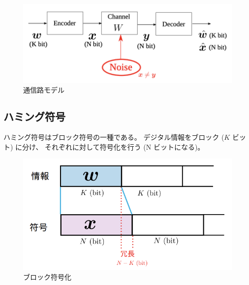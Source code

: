 \documentclass[12pt]{jarticle}
\begin{document}
\begin{figure}[h]
    \begin{center}
        \includegraphics[scale=0.5]{kadai3_3_2.png}
    \end{center}
    \caption{通信路モデル}
\end{figure}

\clearpage

\subsection{ハミング符号}

ハミング符号はブロック符号の一種である。
デジタル情報をブロック ($K$ ビット) に分け、
それぞれに対して符号化を行う (N ビットになる)。
\begin{figure}[h]
    \begin{center}
        \includegraphics[scale=0.5]{kadai3_3_1.png}
    \end{center}
    \caption{ブロック符号化}
\end{figure}
\end{document}
